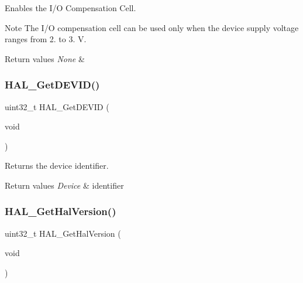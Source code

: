 Enables the I/O Compensation Cell. 

\begin{DoxyNote}{Note}
The I/O compensation cell can be used only when the device supply voltage ranges from 2. to 3. V. 
\end{DoxyNote}

\begin{DoxyRetVals}{Return values}
{\em None} & \\
\hline
\end{DoxyRetVals}
\mbox{\label{group___h_a_l___exported___functions___group2_gaff785f069ed650de77ff82ac407f7c84}} 
\subsubsection{\texorpdfstring{H\+A\+L\+\_\+\+Get\+D\+E\+V\+I\+D()}{HAL\_GetDEVID()}}
{\footnotesize\ttfamily uint32\+\_\+t H\+A\+L\+\_\+\+Get\+D\+E\+V\+ID (\begin{DoxyParamCaption}\item[{void}]{ }\end{DoxyParamCaption})}



Returns the device identifier. 


\begin{DoxyRetVals}{Return values}
{\em Device} & identifier \\
\hline
\end{DoxyRetVals}
\mbox{\label{group___h_a_l___exported___functions___group2_gafb139b375512ad2a234e4619b129b966}} 
\subsubsection{\texorpdfstring{H\+A\+L\+\_\+\+Get\+Hal\+Version()}{HAL\_GetHalVersion()}}
{\footnotesize\ttfamily uint32\+\_\+t H\+A\+L\+\_\+\+Get\+Hal\+Version (\begin{DoxyParamCaption}\item[{void}]{ }\end{DoxyParamCaption})}



